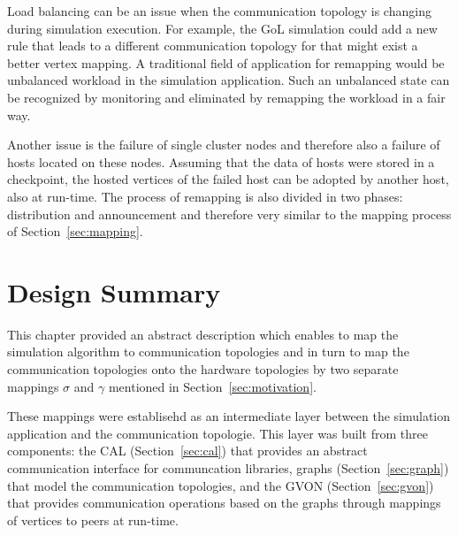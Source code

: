 \noindent Load balancing can be an issue when the communication
topology is changing during simulation execution. For example, the GoL
simulation could add a new rule that leads to a different
communication topology for that might exist a better vertex mapping.
A traditional field of application for remapping would be unbalanced
workload in the simulation application. Such an unbalanced state can
be recognized by monitoring and eliminated by remapping the workload
in a fair way.

Another issue is the failure of single cluster nodes and therefore
also a failure of hosts located on these nodes. Assuming that the data
of hosts were stored in a checkpoint, the hosted vertices of the failed host
can be adopted by another host, also at run-time.
The process of remapping is also divided in two phases:
distribution and announcement and therefore very similar to the mapping process of
Section~\ref{sec:mapping}. 

\section*{Design Summary}
This chapter provided an abstract description which enables to map the
simulation algorithm to communication topologies and in turn to map
the communication topologies onto the hardware topologies by two
separate mappings $\sigma$ and $\gamma$ mentioned in
Section~\ref{sec:motivation}.

These mappings were establisehd as an intermediate layer between the
simulation application and the communication topologie. This layer was
built from three components: the CAL (Section~\ref{sec:cal}) that
provides an abstract communication interface for communcation
libraries, graphs (Section~\ref{sec:graph}) that model the
communication topologies, and the GVON (Section~\ref{sec:gvon})
that provides communication operations based on the graphs through mappings
of vertices to peers at run-time.


\cleardoublepage

